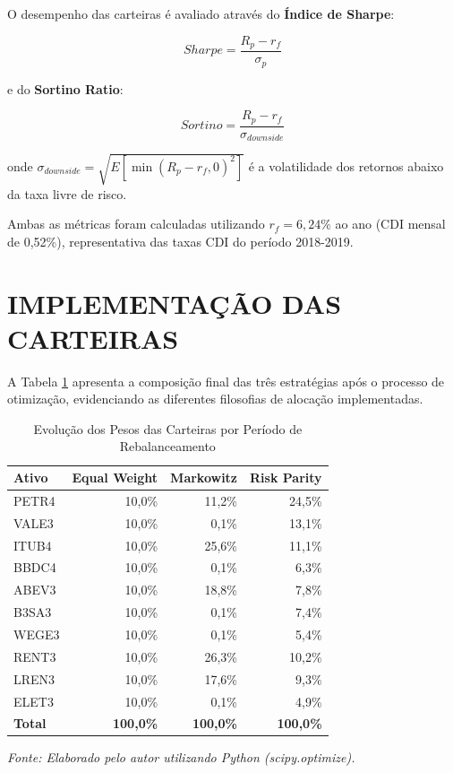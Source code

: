 O desempenho das carteiras é avaliado através do \textbf{Índice de Sharpe}:

\begin{equation}
Sharpe = \frac{R_p - r_f}{\sigma_p}
\end{equation}

e do \textbf{Sortino Ratio}:

\begin{equation}
Sortino = \frac{R_p - r_f}{\sigma_{downside}}
\end{equation}

onde $\sigma_{downside} = \sqrt{E[\min(R_p - r_f, 0)^2]}$ é a volatilidade dos retornos abaixo da taxa livre de risco.

Ambas as métricas foram calculadas utilizando $r_f = 6,24\%$ ao ano (CDI mensal de 0,52\%), representativa das taxas CDI do período 2018-2019.

\section{IMPLEMENTAÇÃO DAS CARTEIRAS}

A Tabela \ref{tab:portfolio_weights} apresenta a composição final das três estratégias após o processo de otimização, evidenciando as diferentes filosofias de alocação implementadas.

\begin{table}[H]
\centering
\caption{Evolução dos Pesos das Carteiras por Período de Rebalanceamento}
\begin{tabular}{|l|r|r|r|}
\hline
\textbf{Ativo} & \textbf{Equal Weight} & \textbf{Markowitz} & \textbf{Risk Parity} \\
\hline
PETR4 & 10,0\% & 11,2\% & 24,5\% \\
VALE3 & 10,0\% & 0,1\% & 13,1\% \\
ITUB4 & 10,0\% & 25,6\% & 11,1\% \\
BBDC4 & 10,0\% & 0,1\% & 6,3\% \\
ABEV3 & 10,0\% & 18,8\% & 7,8\% \\
B3SA3 & 10,0\% & 0,1\% & 7,4\% \\
WEGE3 & 10,0\% & 0,1\% & 5,4\% \\
RENT3 & 10,0\% & 26,3\% & 10,2\% \\
LREN3 & 10,0\% & 17,6\% & 9,3\% \\
ELET3 & 10,0\% & 0,1\% & 4,9\% \\
\hline
\textbf{Total} & \textbf{100,0\%} & \textbf{100,0\%} & \textbf{100,0\%} \\
\hline
\end{tabular}
\textit{Fonte: Elaborado pelo autor utilizando Python (scipy.optimize).}
\label{tab:portfolio_weights}
\end{table}

